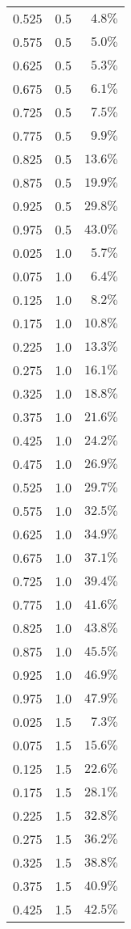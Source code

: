 \begin{longtable}{rrr}
0.525 & 0.5 & $4.8\%$ \\ 
0.575 & 0.5 & $5.0\%$ \\ 
0.625 & 0.5 & $5.3\%$ \\ 
0.675 & 0.5 & $6.1\%$ \\ 
0.725 & 0.5 & $7.5\%$ \\ 
0.775 & 0.5 & $9.9\%$ \\ 
0.825 & 0.5 & $13.6\%$ \\ 
0.875 & 0.5 & $19.9\%$ \\ 
0.925 & 0.5 & $29.8\%$ \\ 
0.975 & 0.5 & $43.0\%$ \\ 
0.025 & 1.0 & $5.7\%$ \\ 
0.075 & 1.0 & $6.4\%$ \\ 
0.125 & 1.0 & $8.2\%$ \\ 
0.175 & 1.0 & $10.8\%$ \\ 
0.225 & 1.0 & $13.3\%$ \\ 
0.275 & 1.0 & $16.1\%$ \\ 
0.325 & 1.0 & $18.8\%$ \\ 
0.375 & 1.0 & $21.6\%$ \\ 
0.425 & 1.0 & $24.2\%$ \\ 
0.475 & 1.0 & $26.9\%$ \\ 
0.525 & 1.0 & $29.7\%$ \\ 
0.575 & 1.0 & $32.5\%$ \\ 
0.625 & 1.0 & $34.9\%$ \\ 
0.675 & 1.0 & $37.1\%$ \\ 
0.725 & 1.0 & $39.4\%$ \\ 
0.775 & 1.0 & $41.6\%$ \\ 
0.825 & 1.0 & $43.8\%$ \\ 
0.875 & 1.0 & $45.5\%$ \\ 
0.925 & 1.0 & $46.9\%$ \\ 
0.975 & 1.0 & $47.9\%$ \\ 
0.025 & 1.5 & $7.3\%$ \\ 
0.075 & 1.5 & $15.6\%$ \\ 
0.125 & 1.5 & $22.6\%$ \\ 
0.175 & 1.5 & $28.1\%$ \\ 
0.225 & 1.5 & $32.8\%$ \\ 
0.275 & 1.5 & $36.2\%$ \\ 
0.325 & 1.5 & $38.8\%$ \\ 
0.375 & 1.5 & $40.9\%$ \\ 
0.425 & 1.5 & $42.5\%$ \\ 

\end{longtable}
